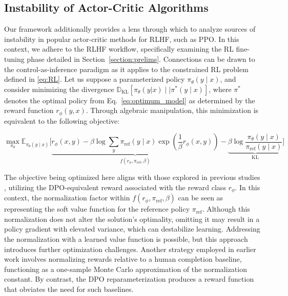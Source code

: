 \subsection{Instability of Actor-Critic Algorithms} Our framework additionally provides a lens through which to analyze sources of instability in popular actor-critic methods for RLHF, such as PPO. In this context, we adhere to the RLHF workflow, specifically examining the RL fine-tuning phase detailed in Section~\ref{section:prelims}. Connections can be drawn to the control-as-inference paradigm \cite{levine2018reinforcement} as it applies to the constrained RL problem defined in \ref{eq:RL}. Let us suppose a parameterized policy $\pi_{\theta}(y\mid x)$, and consider minimizing the divergence $\mathbb{D}_{\text{KL}}[\pi_{\theta}(y|x) \mid\mid \pi^*(y\mid x)]$, where $\pi^*$ denotes the optimal policy from Eq.~\ref{eq:optimum_model} as determined by the reward function $r_{\phi}(y, x)$. Through algebraic manipulation, this minimization is equivalent to the following objective:

\begin{equation}\label{eq:AC}
    \max_{\pi_{\theta}}\mathbb{E}_{\pi_{\theta}(y\mid x)}\bigg[\underbrace{r_{\phi}(x, y) -\beta\log\sum_{y}\pi_\text{ref}(y\mid x)\exp\left(\frac{1}{\beta}r_{\phi}(x, y)\right)}_{f(r_{\phi}, \pi_\text{ref}, \beta)} - \underbrace{\beta\log\frac{\pi_{\theta}(y\mid x)}{\pi_\text{ref}(y\mid x)}}_{\text{KL}}\bigg]
\end{equation}

The objective being optimized here aligns with those explored in previous studies 
\citep{ziegler2020finetuning, stiennon2022learning, bai2022training, ouyang2022training}, utilizing the DPO-equivalent reward associated with the reward class $r_{\phi}$. In this context, the normalization factor within $f(r_{\phi}, \pi_\text{ref}, \beta)$ can be seen as representing the soft value function for the reference policy $\pi_\text{ref}$. Although this normalization does not alter the solution's optimality, omitting it may result in a policy gradient with elevated variance, which can destabilize learning. Addressing the normalization with a learned value function is possible, but this approach introduces further optimization challenges. Another strategy employed in earlier work involves normalizing rewards relative to a human completion baseline, functioning as a one-sample Monte Carlo approximation of the normalization constant. By contrast, the DPO reparameterization produces a reward function that obviates the need for such baselines.

